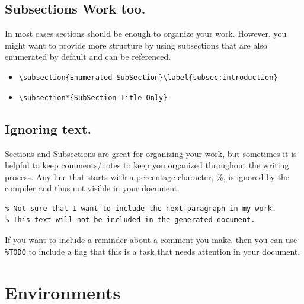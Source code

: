 \documentclass[a4paper,12pt]{article}
\begin{document}
\subsection{Subsections Work too.}
In most cases sections should be enough to organize your work.  However, you might want to provide more structure by using subsections that are also enumerated by default and can be referenced. 

\begin{itemize}
	\item \verb!\subsection{Enumerated SubSection}\label{subsec:introduction}!
  \item \verb!\subsection*{SubSection Title Only}!
\end{itemize}

\subsection{Ignoring text.}

Sections and Subsections are great for organizing your work, but sometimes it is helpful to keep comments/notes to keep you organized throughout the writing process.  Any line that starts with a percentage character, \%, is ignored by the compiler and thus not visible in your document.

\begin{verbatim}
% Not sure that I want to include the next paragraph in my work.  
% This text will not be included in the generated document.
\end{verbatim}

If you want to include a reminder about a comment you make, then you can use \verb!%TODO! to include a flag that this is a task that needs attention in your document.


%
%

\section{Environments}\label{sec:environments}
\end{document}
